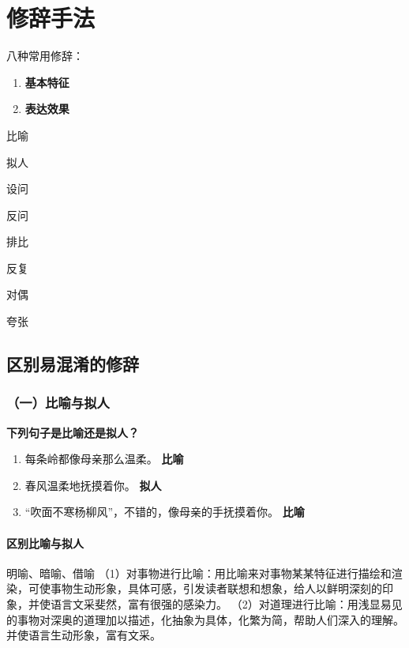 \chapter{修辞手法}


八种常用修辞：
\begin{enumerate}
    \item \textbf{基本特征}
    \item \textbf{表达效果}
\end{enumerate}


\begin{introduction}
  \item 比喻
  \item 拟人
  \item 设问
  \item 反问
  \item 排比
  \item 反复
  \item 对偶
  \item 夸张
\end{introduction}


\section*{区别易混淆的修辞}

\subsection*{（一）比喻与拟人}

\textbf{下列句子是比喻还是拟人？}
\begin{enumerate}
    \item 每条岭都像母亲那么温柔。 \hfill \textbf{比喻}
    \item 春风温柔地抚摸着你。 \hfill \textbf{拟人}
    \item “吹面不寒杨柳风”，不错的，像母亲的手抚摸着你。 \hfill \textbf{比喻}
\end{enumerate}

\subsubsection*{区别比喻与拟人}


\begin{definition}[比喻] \label{def:int} 
明喻、暗喻、借喻
（1）对事物进行比喻：用比喻来对事物某某特征进行描绘和渲染，可使事物生动形象，具体可感，引发读者联想和想象，给人以鲜明深刻的印象，并使语言文采斐然，富有很强的感染力。
（2）对道理进行比喻：用浅显易见的事物对深奥的道理加以描述，化抽象为具体，化繁为简，帮助人们深入的理解。并使语言生动形象，富有文采。
\end{definition}


